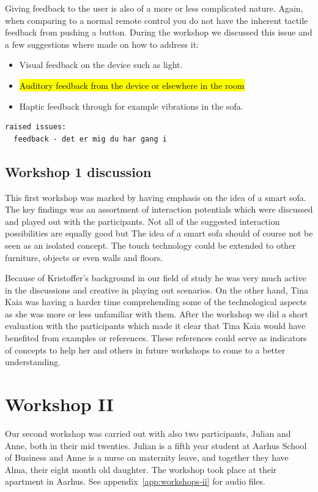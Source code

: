 Giving feedback to the user is also of a more or less complicated nature.
Again, when comparing to a normal remote control you do not have the inherent tactile feedback from pushing a button.
During the workshop we discussed this issue and a few suggestions where made on how to address it:
\begin{itemize}
  \item{Visual feedback on the device such as light.}
  \item{\hl{Auditory feedback from the device or elsewhere in the room} }
  \item{Haptic feedback through for example vibrations in the sofa.}
\end{itemize}

\begin{verbatim}
raised issues:
  feedback - det er mig du har gang i
\end{verbatim}

\subsection{Workshop 1 discussion}
\label{ch:workshops:workshop-i:discussion}

This first workshop was marked by having emphasis on the idea of a smart sofa.
The key findings was an assortment of interaction potentials which were discussed and played out with the participants.
Not all of the suggested interaction possibilities are equally good but \todo{\dots}
The idea of a smart sofa should of course not be seen as an isolated concept.
The touch technology could be extended to other furniture, objects or even walls and floors.

Because of Kristoffer's background in our field of study he was very much active in the discussions and creative in playing out scenarios.
On the other hand, Tina Kaia was having a harder time comprehending some of the technological aspects as she was more or less unfamiliar with them.
After the workshop we did a short evaluation with the participants which made it clear that Tina Kaia would have benefited from examples or references.
These references could serve as indicators of concepts to help her and others in future workshops to come to a better understanding.

\section{Workshop II}
\label{ch:workshops:workshop-ii}
Our second workshop was carried out with also two participants, Julian and Anne, both in their mid twenties.
Julian is a fifth year student at Aarhus School of Business and Anne is a nurse on maternity leave, and together they have Alma, their eight month old daughter.
The workshop took place at their apartment in Aarhus.
See appendix~\ref{app:workshops-ii} for  audio files.


